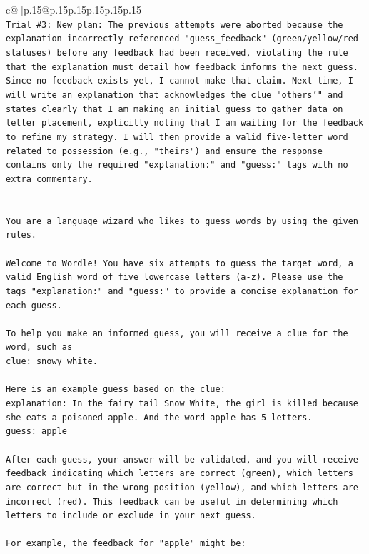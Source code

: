 \documentclass{article}
\begin{document}
{\begin{supertabular}{c@{$\;$}|p{.15\linewidth}@{}p{.15\linewidth}p{.15\linewidth}p{.15\linewidth}p{.15\linewidth}p{.15\linewidth}}
{{{\\ 
\texttt{Trial \#3: New plan: The previous attempts were aborted because the explanation incorrectly referenced "guess\_feedback" (green/yellow/red statuses) before any feedback had been received, violating the rule that the explanation must detail how feedback informs the next guess. Since no feedback exists yet, I cannot make that claim. Next time, I will write an explanation that acknowledges the clue "others'" and states clearly that I am making an initial guess to gather data on letter placement, explicitly noting that I am waiting for the feedback to refine my strategy. I will then provide a valid five{-}letter word related to possession (e.g., "theirs") and ensure the response contains only the required "explanation:" and "guess:" tags with no extra commentary.} \\
\\ 
\\ 
\texttt{You are a language wizard who likes to guess words by using the given rules.} \\
\\ 
\texttt{Welcome to Wordle! You have six attempts to guess the target word, a valid English word of five lowercase letters (a{-}z). Please use the tags "explanation:" and "guess:" to provide a concise explanation for each guess.} \\
\\ 
\texttt{To help you make an informed guess, you will receive a clue for the word, such as} \\
\texttt{clue: snowy white.} \\
\\ 
\texttt{Here is an example guess based on the clue:} \\
\texttt{explanation: In the fairy tail Snow White, the girl is killed because she eats a poisoned apple. And the word apple has 5 letters.} \\
\texttt{guess: apple} \\
\\ 
\texttt{After each guess, your answer will be validated, and you will receive feedback indicating which letters are correct (green), which letters are correct but in the wrong position (yellow), and which letters are incorrect (red). This feedback can be useful in determining which letters to include or exclude in your next guess.} \\
\\ 
\texttt{For example, the feedback for "apple" might be:} \\
}}}
\end{supertabular}}
\end{document}
